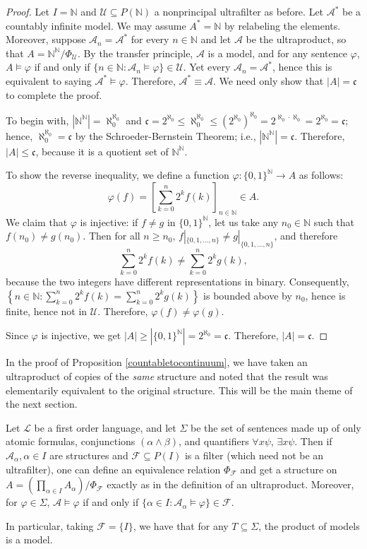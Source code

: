 \documentclass{article}
\def\A{\mathcal A}
\def\F{\mathscr F}
\def\Lang{\mathcal L}
\def\U{\mathscr U}
\def\N{\mathbb N}
\def\cont{\mathfrak c}
\def\denu{\aleph_0}
\begin{document}
\begin{proof}
Let $I=\N$ and $\U\subseteq P(\N)$ a nonprincipal ultrafilter as before.  Let $\A^*$ be a countably infinite model.  We may assume $A^*=\N$ by relabeling the elements.  Moreover, suppose $\A_n=\A^*$ for every $n\in\N$ and let $\A$ be the ultraproduct, so that $A=\N^{\N}/\Phi_\U$.  By the transfer principle, $\A$ is a model, and for any sentence $\varphi$, $A\models\varphi$ if and only if $\{n\in\N:\A_n\models\varphi\}\in\U$.  Yet every $\A_n=\A^*$, hence this is equivalent to saying $\A^*\models\varphi$.  Therefore, $\A^*\equiv\A$.  We need only show that $|A|=\cont$ to complete the proof.

To begin with, $\left|\N^\N\right|=\denu^{\denu}$ and $\cont=2^{\denu}\le\denu^{\denu}\le(2^{\denu})^{\denu}=2^{\denu\cdot\denu}=2^{\denu}=\cont$; hence, $\denu^{\denu}=\cont$ by the Schroeder-Bernstein Theorem; i.e., $\left|\N^\N\right|=\cont$.  Therefore, $|A|\le\cont$, because it is a quotient set of $\N^\N$.

To show the reverse inequality, we define a function $\varphi:\{0,1\}^\N\to A$ as follows:
$$\varphi(f)=\left[\sum_{k=0}^n2^kf(k)\right]_{n\in\N}\in A.$$
We claim that $\varphi$ is injective: if $f\ne g$ in $\{0,1\}^\N$, let us take any $n_0\in\N$ such that $f(n_0)\ne g(n_0)$.  Then for all $n\ge n_0$, $f|_{\{0,1,\dots,n\}}\ne g|_{\{0,1,\dots,n\}}$, and therefore
$$\sum_{k=0}^n2^kf(k)\ne\sum_{k=0}^n2^kg(k),$$
because the two integers have different representations in binary.  Consequently, $\left\{n\in\N:\sum_{k=0}^n2^kf(k)=\sum_{k=0}^n2^kg(k)\right\}$ is bounded above by $n_0$, hence is finite, hence not in $\U$.  Therefore, $\varphi(f)\ne\varphi(g)$.

Since $\varphi$ is injective, we get $|A|\ge\left|\{0,1\}^\N\right|=2^{\denu}=\cont$.  Therefore, $|A|=\cont$.
\end{proof}

\noindent In the proof of Proposition \ref{countabletocontinuum}, we have taken an ultraproduct of copies of the \emph{same} structure and noted that the result was elementarily equivalent to the original structure.  This will be the main theme of the next section.

\begin{exercise}
Let $\Lang$ be a first order language, and let $\Sigma$ be the set of sentences made up of only atomic formulas, conjunctions $(\alpha\wedge\beta)$, and quantifiers $\forall x\psi$, $\exists x\psi$.  Then if $\A_\alpha,\alpha\in I$ are structures and $\F\subseteq P(I)$ is a filter (which need not be an ultrafilter), one can define an equivalence relation $\Phi_\F$ and get a structure on $A=\left(\prod_{\alpha\in I}A_\alpha\right)/\Phi_\F$ exactly as in the definition of an ultraproduct.  Moreover, for $\varphi\in\Sigma$, $\A\models\varphi$ if and only if $\{\alpha\in I:\A_\alpha\models\varphi\}\in\F$.

In particular, taking $\F=\{I\}$, we have that for any $T\subseteq\Sigma$, the product of models is a model.
\end{exercise}
\end{document}
